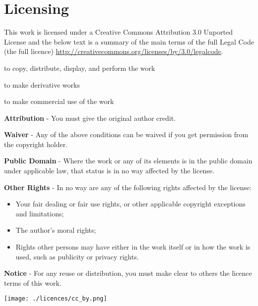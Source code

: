 \chapter{Licensing}

This work is licensed under a Creative Commons Attribution 3.0 Unported License and
the below text is a summary of the main terms of the full Legal Code (the full licence)
\url{http://creativecommons.org/licenses/by/3.0/legalcode}.

\begin{description}[style=multiline,labelindent=0cm,align=left,leftmargin=1.5cm]
\item[You are free:] \hfill

  to copy, distribute, display, and perform the work
  
  to make derivative works
  
  to make commercial use of the work
  
\item[Under the following conditions:] \hfill

  \textbf{Attribution} - You must give the original author credit.
  
\item[With the understanding that:] \hfill

  \textbf{Waiver} - Any of the above conditions can be waived if you get permission from the
  copyright holder.
  
  \textbf{Public Domain} - Where the work or any of its elements is in the public domain
  under applicable law, that status is in no way affected by the license.
  
  \textbf{Other Rights} - In no way are any of the following rights affected by the license:
  
  \begin{itemize}
    \item Your fair dealing or fair use rights, or other applicable copyright exceptions and limitations;
  
    \item The author's moral rights;
  
    \item Rights other persons may have either in the work itself or in how the work is used, such
    as publicity or privacy rights.
  \end{itemize}
  
  \textbf{Notice} - For any reuse or distribution, you must make clear to others the
  licence terms of this work.
  
\end{description}

\vspace{\vfill}

\begin{center}
\texttt{[image: ./licences/cc\_by.png]}
\end{center}
